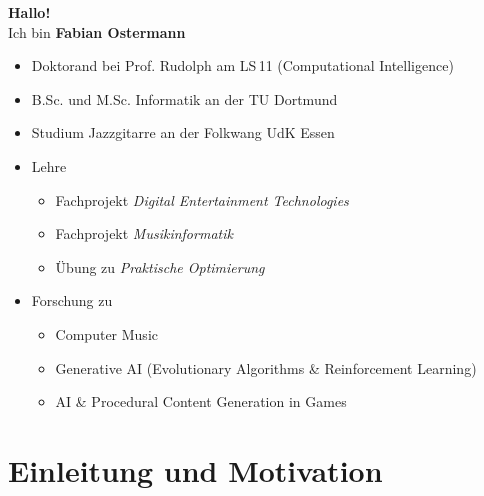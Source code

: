 \begin{frame}
	\centering
	{\color{TUDoGreen} \huge\textbf{Hallo!}}\\
	\medskip
	\Large Ich bin \textbf{Fabian Ostermann}
	
	\bigskip
	\begin{itemize}
		\normalsize
		\item Doktorand bei Prof. Rudolph am LS\,11 (Computational Intelligence)\\
		\item B.Sc. und M.Sc. Informatik an der TU Dortmund\\
		\item Studium Jazzgitarre an der Folkwang UdK Essen
		\item Lehre
		\begin{itemize}
			\item Fachprojekt \emph{Digital Entertainment Technologies}
			\item Fachprojekt \emph{Musikinformatik}
			\item Übung zu \emph{Praktische Optimierung}
		\end{itemize}
		\item Forschung zu
		\begin{itemize}
			\item Computer Music
			\item Generative AI (Evolutionary Algorithms \& Reinforcement Learning)
			\item AI \& Procedural Content Generation in Games
		\end{itemize}
	\end{itemize}
\end{frame}

\section{Einleitung und Motivation}

